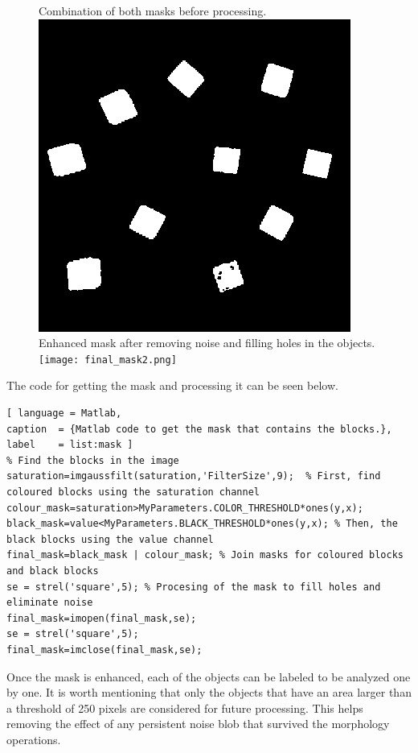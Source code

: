 \begin{figure}[H]
	\captionbox  %
	{
		Combination of both masks before processing.             
		\label{fig:final_mask}                                  
	}                                                                 
	{                                                                  
		\includegraphics[width=.25\textwidth]{figures/final_mask.png}         
	}                                                                    
	\hspace{5pt}                                                          
	\captionbox
	{       
		Enhanced mask after removing noise and filling holes in the objects.
		\label{fig:final_mask2}                                     
	}
	{
		\texttt{[image: final\_mask2.png]}            
	}                                                                             
\end{figure}

The code for getting the mask and processing it can be seen below.
%
\begin{lstlisting}[ language = Matlab,
caption  = {Matlab code to get the mask that contains the blocks.},
label    = list:mask ]
% Find the blocks in the image
saturation=imgaussfilt(saturation,'FilterSize',9);  % First, find coloured blocks using the saturation channel
colour_mask=saturation>MyParameters.COLOR_THRESHOLD*ones(y,x);
black_mask=value<MyParameters.BLACK_THRESHOLD*ones(y,x); % Then, the black blocks using the value channel
final_mask=black_mask | colour_mask; % Join masks for coloured blocks and black blocks
se = strel('square',5); % Procesing of the mask to fill holes and eliminate noise
final_mask=imopen(final_mask,se);
se = strel('square',5);
final_mask=imclose(final_mask,se);
\end{lstlisting}

Once the mask is enhanced, each of the objects can be labeled to be analyzed one by one. It is worth mentioning that only the objects that have an area larger than a threshold of 250 pixels are considered for future processing. This helps removing the effect of any persistent noise blob that survived the morphology operations.

